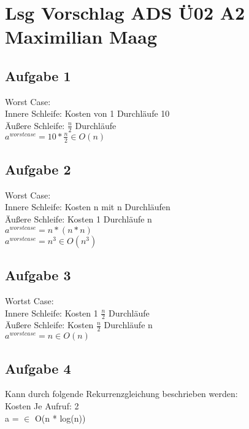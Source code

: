 \documentclass{article}
\begin{document}
	\section*{Lsg Vorschlag ADS Ü02 A2 Maximilian Maag}
	\subsection*{Aufgabe 1}
	Worst Case: \\
	Innere Schleife: Kosten von 1 Durchläufe 10 \\
	Äußere Schleife: $\frac{n}{2}$ Durchläufe \\
	$a^{worstcase} = 10 * \frac{n}{2} \in O(n)$
	\subsection*{Aufgabe 2}
	Worst Case: \\
	Innere Schleife: Kosten n mit n Durchläufen \\
	Äußere Schleife: Kosten 1 Durchläufe n \\
	$a^{worstcase} = n * (n*n)$ \\
	$a^{worstcase} = n^3 \in O(n^3)$
	
	\subsection*{Aufgabe 3}
	Wortst Case: \\
	Innere Schleife: Kosten 1 $\frac{n}{2}$ Durchläufe \\
	Äußere Schleife: Kosten $\frac{n}{2}$ Durchläufe n \\
	$a^{worstcase} = n \in O(n)$
	\subsection*{Aufgabe 4}
	Kann durch folgende Rekurrenzgleichung beschrieben werden: \\
	Kosten Je Aufruf: 2 \\
	a = $\in$ O(n * log(n))
    
\end{document}

